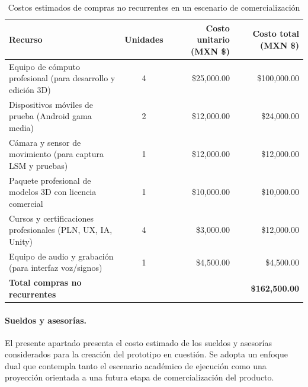 \begin{table}[H]
	\centering
	\renewcommand{\arraystretch}{1.6}
	\setlength{\tabcolsep}{10pt}
	\Huge
	\begin{adjustbox}{max width=\textwidth}
		\begin{tabular}{|p{7cm}|c|r|r|}
			\hline
			\textbf{Recurso} & \textbf{Unidades} & \textbf{Costo unitario (MXN \$)} & \textbf{Costo total (MXN \$)} \\ \hline
			Equipo de cómputo profesional (para desarrollo y edición 3D) & 4 & \$25,000.00 & \$100,000.00 \\ \hline
			Dispositivos móviles de prueba (Android gama media) & 2 & \$12,000.00 & \$24,000.00 \\ \hline
			Cámara y sensor de movimiento (para captura LSM y pruebas) & 1 & \$12,000.00 & \$12,000.00 \\ \hline
			Paquete profesional de modelos 3D con licencia comercial & 1 & \$10,000.00 & \$10,000.00 \\ \hline
			Cursos y certificaciones profesionales (PLN, UX, IA, Unity) & 4 & \$3,000.00 & \$12,000.00 \\ \hline
			Equipo de audio y grabación (para interfaz voz/signos) & 1 & \$4,500.00 & \$4,500.00 \\ \hline
			\textbf{Total compras no recurrentes} & & & \textbf{\$162,500.00} \\ \hline
		\end{tabular}
	\end{adjustbox}
	\caption{Costos estimados de compras no recurrentes en un escenario de comercialización}
	\label{tab:compras_no_recurrentes_comercial}
\end{table}


\paragraph{\textbf{Sueldos y asesorías.}} 
El presente apartado presenta el costo estimado de los sueldos y asesorías considerados para la creación del prototipo en cuestión. Se adopta un enfoque dual que contempla tanto el escenario académico de ejecución como una proyección orientada a una futura etapa de comercialización del producto.

